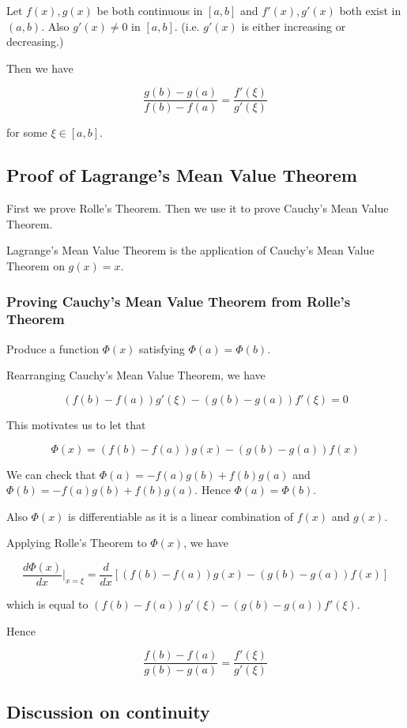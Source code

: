 Let $f(x), g(x)$ be both continuous in $[a, b]$ and $f'(x), g'(x)$ both exist in $(a, b)$. Also $g'(x) \not = 0$ in $[a, b]$. (i.e. $g'(x)$ is either increasing or decreasing.)

Then we have

$$\frac{g(b) - g(a)}{f(b) - f(a)} = \frac{f'(\xi)}{g'(\xi)}$$

for some $\xi \in [a, b]$.

\subsection{Proof of Lagrange's Mean Value Theorem}

First we prove Rolle's Theorem. Then we use it to prove Cauchy's Mean Value Theorem.

Lagrange's Mean Value Theorem is the application of Cauchy's Mean Value Theorem on $g(x) = x$. 

\subsubsection{Proving Cauchy's Mean Value Theorem from Rolle's Theorem}

Produce a function $\Phi(x)$ satisfying $\Phi(a) = \Phi(b)$.

Rearranging Cauchy's Mean Value Theorem, we have

$$ (f(b) - f(a)) g'(\xi) - (g(b) - g(a)) f'(\xi) = 0 $$

This motivates us to let that

$$ \Phi(x) = (f(b) - f(a)) g(x) - (g(b) - g(a)) f(x) $$

We can check that $\Phi(a) = -f(a)g(b) + f(b)g(a)$ and $\Phi(b) = -f(a)g(b) + f(b)g(a)$. Hence $\Phi(a) = \Phi(b)$.

Also $\Phi(x)$ is differentiable as it is a linear combination of $f(x)$ and $g(x)$.

Applying Rolle's Theorem to $\Phi(x)$, we have

$$ \frac{d\Phi(x)}{dx}|_{x=\xi} = \frac{d}{dx}[ (f(b) - f(a)) g(x) - (g(b) - g(a))f(x) ] $$

which is equal to $(f(b) - f(a)) g'(\xi) - (g(b) - g(a)) f'(\xi)$.

Hence

$$ \frac{f(b) - f(a)}{g(b) - g(a)} = \frac{f'(\xi)}{g'(\xi)} $$

\subsection{Discussion on continuity}

